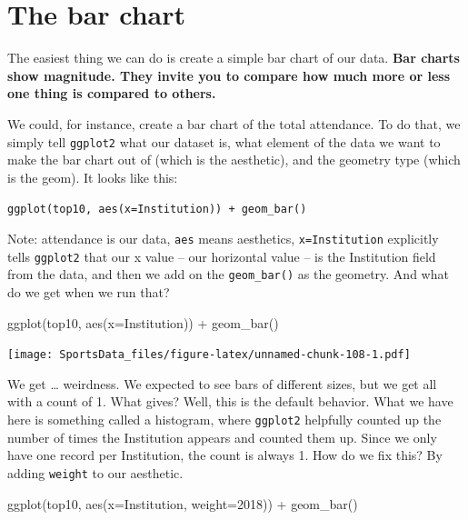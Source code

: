 \documentclass[
]{book}
\newenvironment{Shaded}{\begin{snugshade}}{\end{snugshade}}
\newcommand{\AttributeTok}[1]{\textcolor[rgb]{0.77,0.63,0.00}{#1}}
\newcommand{\FunctionTok}[1]{\textcolor[rgb]{0.00,0.00,0.00}{#1}}
\newcommand{\NormalTok}[1]{#1}
\newcommand{\SpecialCharTok}[1]{\textcolor[rgb]{0.00,0.00,0.00}{#1}}
\newcommand{\StringTok}[1]{\textcolor[rgb]{0.31,0.60,0.02}{#1}}
\begin{document}
\hypertarget{the-bar-chart}{%
\section{The bar chart}\label{the-bar-chart}}

The easiest thing we can do is create a simple bar chart of our data. \textbf{Bar charts show magnitude. They invite you to compare how much more or less one thing is compared to others.}

We could, for instance, create a bar chart of the total attendance. To do that, we simply tell \texttt{ggplot2} what our dataset is, what element of the data we want to make the bar chart out of (which is the aesthetic), and the geometry type (which is the geom). It looks like this:

\texttt{ggplot(top10,\ aes(x=Institution))\ +\ geom\_bar()}

Note: attendance is our data, \texttt{aes} means aesthetics, \texttt{x=Institution} explicitly tells \texttt{ggplot2} that our x value -- our horizontal value -- is the Institution field from the data, and then we add on the \texttt{geom\_bar()} as the geometry. And what do we get when we run that?

\begin{Shaded}
\begin{Highlighting}[]
\FunctionTok{ggplot}\NormalTok{(top10, }\FunctionTok{aes}\NormalTok{(}\AttributeTok{x=}\NormalTok{Institution)) }\SpecialCharTok{+} \FunctionTok{geom\_bar}\NormalTok{()}
\end{Highlighting}
\end{Shaded}

\texttt{[image: SportsData\_files/figure-latex/unnamed-chunk-108-1.pdf]}

We get \ldots{} weirdness. We expected to see bars of different sizes, but we get all with a count of 1. What gives? Well, this is the default behavior. What we have here is something called a histogram, where \texttt{ggplot2} helpfully counted up the number of times the Institution appears and counted them up. Since we only have one record per Institution, the count is always 1. How do we fix this? By adding \texttt{weight} to our aesthetic.

\begin{Shaded}
\begin{Highlighting}[]
\FunctionTok{ggplot}\NormalTok{(top10, }\FunctionTok{aes}\NormalTok{(}\AttributeTok{x=}\NormalTok{Institution, }\AttributeTok{weight=}\StringTok{\textasciigrave{}}\AttributeTok{2018}\StringTok{\textasciigrave{}}\NormalTok{)) }\SpecialCharTok{+} 
  \FunctionTok{geom\_bar}\NormalTok{()}
\end{Highlighting}
\end{Shaded}
\end{document}
